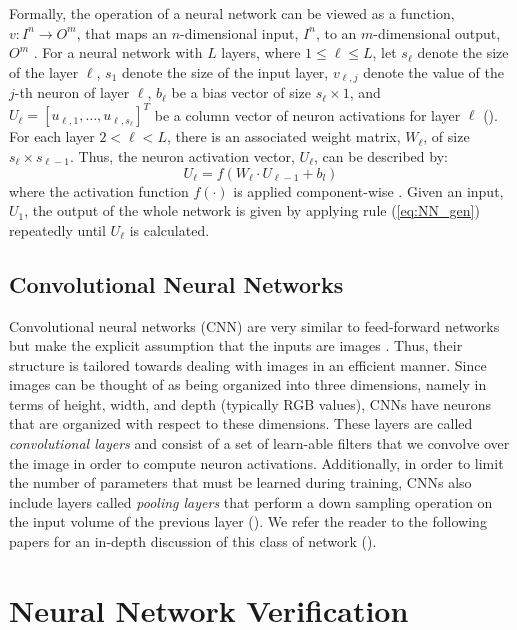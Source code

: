 \documentclass[10pt,conference]{IEEEtran}
\begin{document}
\indent Formally, the operation of a neural network can be viewed as a function, $v:I^n \rightarrow O^m$, that maps an $n$-dimensional input, $I^n$, to an $m$-dimensional output, $O^m$ \cite{LeofanteAdvances2018}. For a neural network with $L$ layers, where $1 \leq \ell \leq L$, let $s_\ell$ denote the size of the layer $\ell$, $s_1$ denote the size of the input layer, $v_{\ell,j}$ denote the value of the $j$-th neuron of layer $\ell$, $b_\ell$ be a bias vector of size $s_\ell \times 1$, and $U_\ell=[u_{\ell,1},\dots,u_{\ell,s_\ell}]^T$ be a column vector of neuron activations for layer $\ell$  (\cite{WeimingReachability2018,KatzReluplex2017}). For each layer $2<\ell<L$, there is an associated weight  matrix, $W_\ell$, of size $s_\ell \times s_{\ell-1}$. Thus, the neuron activation vector, $U_\ell$, can be described by:
\begin{equation}
U_\ell=f(W_\ell \cdot U_{\ell-1}+b_l) \label{eq:NN_gen}
\end{equation}
where the activation function $f(\cdot)$ is applied component-wise \cite{KatzReluplex2017}. Given an input, $U_1$, the output of the whole network is given by applying rule (\ref{eq:NN_gen}) repeatedly until $U_\ell$ is calculated. %
\subsection{Convolutional Neural Networks}
Convolutional neural networks (CNN) are very similar to feed-forward networks but make the explicit assumption that the inputs are images \cite{karpathyConv}. Thus, their structure is tailored towards dealing with images in an efficient manner. Since images can be thought of as being organized into three dimensions, namely in terms of height, width, and depth (typically RGB values), CNNs have neurons that are organized with respect to these dimensions. These layers are called \emph{convolutional layers} and consist of a set of learn-able filters that we convolve over the image in order to compute neuron activations. Additionally, in order to limit the number of parameters that must be learned during training, CNNs also include layers called \emph{pooling layers} that perform a down sampling operation on the input volume of the previous layer (\cite{karpathyConv,HuangSafetyVerification2016}). We refer the reader to  the following papers for an in-depth discussion of this class of network (\cite{karpathyConv,HuangSafetyVerification2016}).
\section{Neural Network Verification \label{sec: Verification}}
\end{document}
